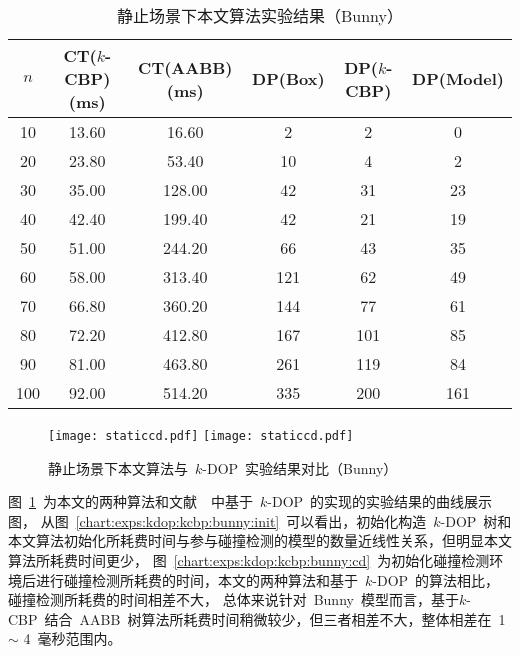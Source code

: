 \begin{table}[htbp]  
\centering
\caption{静止场景下本文算法实验结果（Bunny）}
\label{tab:exp:bunny:k24:kdop:kcbp:detail}
\begin{tabular}{cccccc}
\toprule[1.5pt]
$n$ & CT($k$-CBP)(ms) &  CT(AABB)(ms) & DP(Box) & DP($k$-CBP) & DP(Model)\\
\midrule[1.0pt]
10 &  13.60 &	16.60      & 2   &2   & 0  \\
20 &  23.80 &	53.40      & 10  &4   & 2  \\
30 &  35.00 &	128.00     & 42  &31  & 23 \\
40 &  42.40 &	199.40     & 42  &21  & 19 \\
50 &  51.00 &	244.20     & 66  &43  & 35 \\
60 &  58.00 &	313.40     & 121 &62  & 49 \\
70 &  66.80 &	360.20     & 144 &77  & 61 \\
80 &  72.20 &	412.80     & 167 &101 & 85 \\
90 &  81.00 &	463.80     & 261 &119 & 84 \\
100&  92.00 &	514.20     & 335 &200 & 161\\
\bottomrule[1.5pt]
\end{tabular}
\end{table}

\begin{figure}[!ht] 
\centering
{}
{
    \texttt{[image: staticcd.pdf]}
}
\hspace{1em}
{  
   \texttt{[image: staticcd.pdf]}
}
\caption{静止场景下本文算法与~$k$-DOP~实验结果对比（Bunny）}
\label{chart:exps:kdop:kcbp:bunny}
\end{figure}

图~\ref{chart:exps:kdop:kcbp:bunny}~为本文的两种算法和文献~~中基于~$k$-DOP~的实现的实验结果的曲线展示图，
从图~\ref{chart:exps:kdop:kcbp:bunny:init}~可以看出，初始化构造~$k$-DOP~树和本文算法初始化所耗费时间与参与碰撞检测的模型的数量近线性关系，但明显本文算法所耗费时间更少，
图~\ref{chart:exps:kdop:kcbp:bunny:cd}~为初始化碰撞检测环境后进行碰撞检测所耗费的时间，本文的两种算法和基于~$k$-DOP~的算法相比，碰撞检测所耗费的时间相差不大，
总体来说针对~Bunny~模型而言，基于$k$-CBP~结合~AABB~树算法所耗费时间稍微较少，但三者相差不大，整体相差在~1 $\sim$ 4~毫秒范围内。


